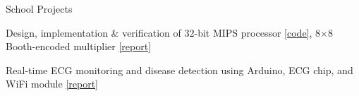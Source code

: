 \documentclass{resume} %
\begin{document}
\begin{rSection}{School Projects}
\begin{rSubsection}{}{}{}{}
\item {Design, implementation \& verification of $32$-bit MIPS processor} \href{https://github.com/tanvir9476/32bitMIPS}{[code]}, 8$\times$8 Booth-encoded multiplier \href{https://drive.google.com/file/d/1XHYrMskXe0XTP0NAW0QJICng4clui1WW/view?usp=sharing}{[report]}
\item {Real-time ECG monitoring and disease detection using Arduino, ECG chip, and WiFi module} \href{https://drive.google.com/file/d/1sntnS67vnhDraV8bPi1uSlVU95TLUpI6/view?usp=sharing}{[report]}
\end{rSubsection}











\end{rSection}
\end{document}
